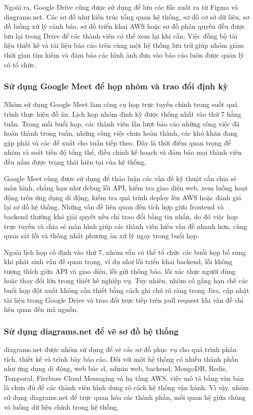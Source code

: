 \par Ngoài ra, Google Drive cũng được sử dụng để lưu các file xuất ra từ Figma và diagrams.net. Các sơ đồ như kiến trúc tổng quan hệ thống, sơ đồ cơ sở dữ liệu, sơ đồ luồng xử lý cảnh báo, sơ đồ triển khai AWS hoặc sơ đồ phân quyền đều được lưu lại trong Drive để các thành viên có thể xem lại khi cần. Việc đồng bộ tài liệu thiết kế và tài liệu báo cáo trên cùng một hệ thống lưu trữ giúp nhóm giảm thời gian tìm kiếm và đảm bảo các hình ảnh đưa vào báo cáo luôn được quản lý có tổ chức.

\subsubsection{Sử dụng Google Meet để họp nhóm và trao đổi định kỳ}
\par Nhóm sử dụng Google Meet làm công cụ họp trực tuyến chính trong suốt quá trình thực hiện đồ án. Lịch họp nhóm định kỳ được thống nhất vào thứ 7 hằng tuần. Trong mỗi buổi họp, các thành viên lần lượt báo cáo những công việc đã hoàn thành trong tuần, những công việc chưa hoàn thành, các khó khăn đang gặp phải và các đề xuất cho tuần tiếp theo. Đây là thời điểm quan trọng để nhóm rà soát tiến độ tổng thể, điều chỉnh kế hoạch và đảm bảo mọi thành viên đều nắm được trạng thái hiện tại của hệ thống.

\par Google Meet cũng được sử dụng để thảo luận các vấn đề kỹ thuật cần chia sẻ màn hình, chẳng hạn như debug lỗi API, kiểm tra giao diện web, xem luồng hoạt động trên ứng dụng di động, kiểm tra quá trình deploy lên AWS hoặc đánh giá lại sơ đồ hệ thống. Những vấn đề liên quan đến tích hợp giữa frontend và backend thường khó giải quyết nếu chỉ trao đổi bằng tin nhắn, do đó việc họp trực tuyến và chia sẻ màn hình giúp các thành viên hiểu vấn đề nhanh hơn, cùng quan sát lỗi và thống nhất phương án xử lý ngay trong buổi họp.

\par Ngoài lịch họp cố định vào thứ 7, nhóm vẫn có thể tổ chức các buổi họp bổ sung khi phát sinh vấn đề quan trọng, ví dụ như lỗi triển khai backend, lỗi không tương thích giữa API và giao diện, lỗi gửi thông báo, lỗi xác thực người dùng hoặc thay đổi lớn trong thiết kế nghiệp vụ. Tuy nhiên, nhóm cố gắng hạn chế các buổi họp đột xuất không cần thiết bằng cách ghi chú rõ ràng trong Jira, cập nhật tài liệu trong Google Drive và trao đổi trực tiếp trên pull request khi vấn đề chỉ liên quan đến mã nguồn.

\subsubsection{Sử dụng diagrams.net để vẽ sơ đồ hệ thống}
\par diagrams.net được nhóm sử dụng để vẽ các sơ đồ phục vụ cho quá trình phân tích, thiết kế và trình bày báo cáo. Đối với một hệ thống có nhiều thành phần như ứng dụng di động, web bác sĩ, admin web, backend, MongoDB, Redis, Temporal, Firebase Cloud Messaging và hạ tầng AWS, việc mô tả bằng văn bản là chưa đủ để các thành viên hình dung rõ cách hệ thống vận hành. Vì vậy, nhóm sử dụng diagrams.net để trực quan hóa các thành phần, mối quan hệ giữa chúng và luồng dữ liệu chính trong hệ thống.

